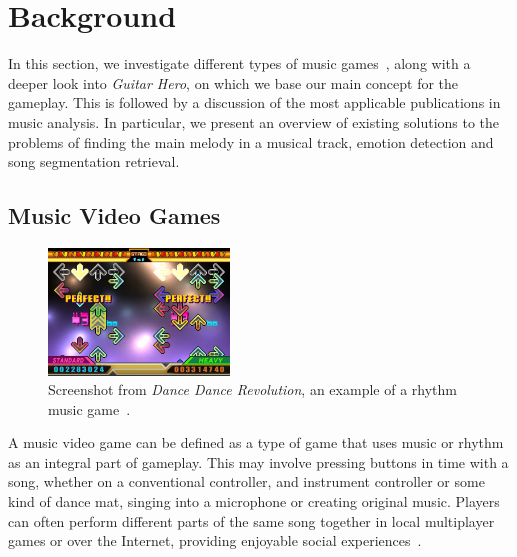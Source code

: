 
\chapter{Background} 

\label{Chapter4} 

\fancyhead[LE,RO]{\thepage}


In this section, we investigate different types of music games~\cite{gametypes}, along with a deeper look into \textit{Guitar Hero}, on which we base our main concept for the gameplay. This is followed by a discussion of the most applicable publications in music analysis. In particular, we present an overview of existing solutions to the problems of finding the main melody in a musical track, emotion detection and song segmentation retrieval.

\vspace{20pt}


\section{Music Video Games }

\begin{figure}
  \vspace{-40pt}

  \begin{center}
    \includegraphics[width=0.43\textwidth]{Figures/dancedancerevolution}
  \end{center}
  \caption{Screenshot from \textit{Dance Dance Revolution}, an example of a rhythm music game~\cite{DDR}.}
  \label{fig:DDR}
\end{figure}

A music video game can be defined as a type of game that uses music or rhythm as an integral part of gameplay. This may involve pressing buttons in time with a song, whether on a conventional controller, and instrument controller or some kind of dance mat, singing into a microphone or creating original music. Players can often perform different parts of the same song together in local multiplayer games or over the Internet, providing enjoyable social experiences~\cite{mvgdef}.

